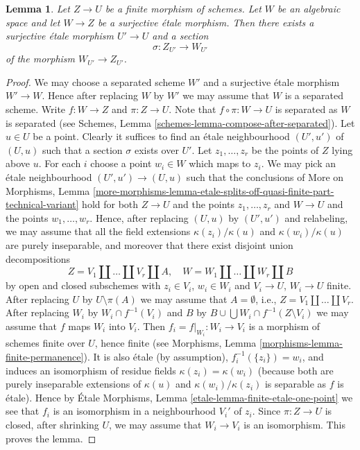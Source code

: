 \documentclass{stacks-project}
\theoremstyle{plain}
\newtheorem{lemma}[subsection]{Lemma}
\theoremstyle{definition}
\theoremstyle{remark}
\numberwithin{equation}{subsection}
\begin{document}
\begin{lemma}
\label{lemma-surjection-space-of-sections}
Let $Z \to U$ be a finite morphism of schemes.
Let $W$ be an algebraic space and let $W \to Z$ be a
surjective \'etale morphism. Then there exists a surjective
\'etale morphism $U' \to U$ and a section
$$
\sigma : Z_{U'} \to W_{U'}
$$
of the morphism $W_{U'} \to Z_{U'}$.
\end{lemma}

\begin{proof}
We may choose a separated scheme $W'$ and a surjective \'etale morphism
$W' \to W$. Hence after replacing $W$ by $W'$ we may assume that $W$
is a separated scheme. Write $f : W \to Z$ and $\pi : Z \to U$.
Note that $f \circ \pi : W \to U$ is separated as
$W$ is separated (see
Schemes, Lemma \ref{schemes-lemma-compose-after-separated}).
Let $u \in U$ be a point. Clearly it suffices
to find an \'etale neighbourhood $(U', u')$ of $(U, u)$ such that
a section $\sigma$ exists over $U'$. Let $z_1, \ldots, z_r$
be the points of $Z$ lying above $u$. For each $i$ choose a point
$w_i \in W$ which maps to $z_i$. We may pick an \'etale neighbourhood
$(U', u') \to (U, u)$ such that the conclusions of
More on Morphisms, Lemma
\ref{more-morphisms-lemma-etale-splits-off-quasi-finite-part-technical-variant}
hold for both $Z \to U$ and the points $z_1, \ldots, z_r$
and $W \to U$ and the points $w_1, \ldots, w_r$. Hence, after
replacing $(U, u)$ by $(U', u')$ and relabeling, we may assume that
all the field extensions $\kappa(z_i)/\kappa(u)$ and
$\kappa(w_i)/\kappa(u)$ are purely inseparable, and moreover
that there exist disjoint union decompositions
$$
Z = V_1 \amalg \ldots \amalg V_r \amalg A, \quad
W = W_1 \amalg \ldots \amalg W_r \amalg B
$$
by open and closed subschemes
with $z_i \in V_i$, $w_i \in W_i$ and $V_i \to U$, $W_i \to U$ finite.
After replacing $U$ by $U \setminus \pi(A)$ we may assume that
$A = \emptyset$, i.e., $Z = V_1 \amalg \ldots \amalg V_r$.
After replacing $W_i$ by $W_i \cap f^{-1}(V_i)$ and
$B$ by $B \cup \bigcup W_i \cap f^{-1}(Z \setminus V_i)$
we may assume that $f$ maps $W_i$ into $V_i$.
Then $f_i = f|_{W_i} : W_i \to V_i$ is a morphism of schemes finite over $U$,
hence finite (see
Morphisms, Lemma \ref{morphisms-lemma-finite-permanence}).
It is also \'etale (by assumption),
$f_i^{-1}(\{z_i\}) = w_i$, and induces an isomorphism of residue
fields $\kappa(z_i) = \kappa(w_i)$ (because both are purely inseparable
extensions of $\kappa(u)$ and $\kappa(w_i)/\kappa(z_i)$
is separable as $f$ is \'etale). Hence by
\'Etale Morphisms, Lemma \ref{etale-lemma-finite-etale-one-point}
we see that $f_i$ is an isomorphism in a neighbourhood $V_i'$ of
$z_i$. Since $\pi : Z \to U$ is closed, after shrinking $U$, we may assume
that $W_i \to V_i$ is an isomorphism. This proves the lemma.
\end{proof}
\end{document}
